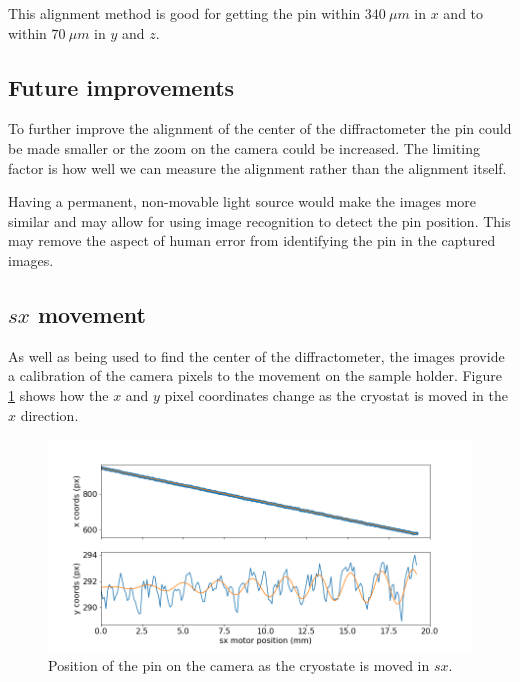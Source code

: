 \documentclass[a4paper,12pt]{article}
\begin{document}
This alignment method is good for getting the pin within $340~\mu m$ in $x$ and to within $70~\mu m$ in $y$ and $z$.



\subsection{Future improvements}

To further improve the alignment of the center of the diffractometer the pin could be made smaller or the zoom on the camera could be increased. The limiting factor is how well we can measure the alignment rather than the alignment itself.

Having a permanent, non-movable light source would make the images more similar and may allow for using image recognition to detect the pin position. This may remove the aspect of human error from identifying the pin in the captured images.






\subsection{$sx$ movement}

As well as being used to find the center of the diffractometer, the images provide a calibration of the camera pixels to the movement on the sample holder. Figure \ref{sx_movement} shows how the $x$ and $y$ pixel coordinates change as the cryostat is moved in the $x$ direction.

\begin{figure}[tbh]
	\centering
	\includegraphics[width=17cm]{graphics/sx_movement.png}
	\caption{Position of the pin on the camera as the cryostate is moved in $sx$.}
	\label{sx_movement}
\end{figure}
\end{document}
